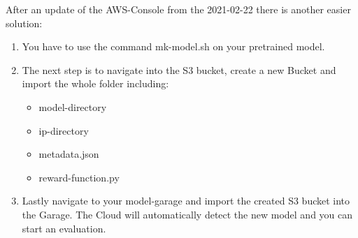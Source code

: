 After an update of the AWS-Console from the 2021-02-22 there is another easier solution:

\begin{enumerate}
    \item You have to use the command mk-model.sh on your pretrained model.
    \item The next step is to navigate into the S3 bucket, create a new Bucket and import the whole folder including:
    \begin{itemize}
        \item model-directory
        \item ip-directory
        \item metadata.json
        \item reward-function.py
    \end{itemize}
    \item Lastly navigate to your model-garage and import the created S3 bucket into the Garage. The Cloud will automatically detect the new model and you can start an evaluation.
\end{enumerate}

